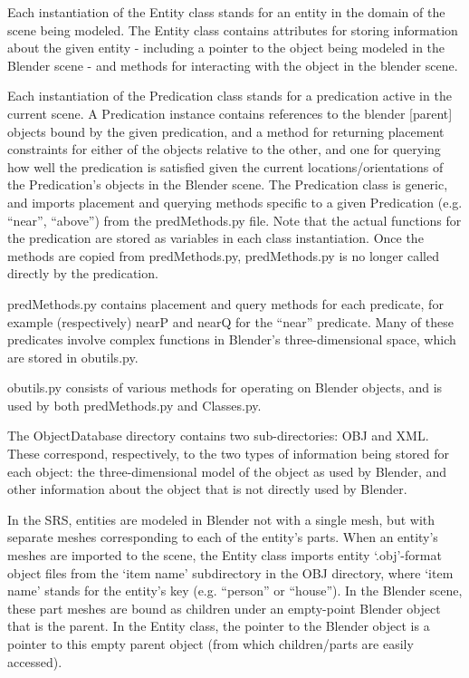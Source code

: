 Each instantiation of the Entity class stands for an entity in the domain of the scene being modeled. The Entity class contains attributes for storing information about the given entity - including a pointer to the object being modeled in the Blender scene - and methods for interacting with the object in the blender scene.
	
Each instantiation of the Predication class stands for a predication active in the current scene. A Predication instance contains references to the blender [parent] objects bound by the given predication, and a method for returning placement constraints for either of the objects relative to the other, and one for querying how well the predication is satisfied given the current locations/orientations of the Predication’s objects in the Blender scene. The Predication class is generic, and imports placement and querying methods specific to a given Predication (e.g. “near”, “above”) from the predMethods.py file. Note that the actual functions for the predication are stored as variables in each class instantiation. Once the methods are copied from predMethods.py, predMethods.py is no longer called directly by the predication.

predMethods.py contains placement and query methods for each predicate, for example (respectively) nearP and nearQ for the “near” predicate. Many of these predicates involve complex functions in Blender’s three-dimensional space, which are stored in obutils.py.

obutils.py consists of various methods for operating on Blender objects, and is used by both predMethods.py and Classes.py.

The ObjectDatabase directory contains two sub-directories: OBJ and XML. These correspond, respectively, to the two types of information being stored for each object: the three-dimensional model of the object as used by Blender, and other information about the object that is not directly used by Blender. 

In the SRS, entities are modeled in Blender not with a single mesh, but with separate meshes corresponding to each of the entity’s parts. When an entity’s meshes are imported to the scene, the Entity class imports entity ‘.obj’-format object files from the ‘item name’ subdirectory in the OBJ directory, where ‘item name’ stands for the entity’s key (e.g. “person” or “house”). In the Blender scene, these part meshes are bound as children under an empty-point Blender object that is the parent. In the Entity class, the pointer to the Blender object is a pointer to this empty parent object (from which children/parts are easily accessed).

